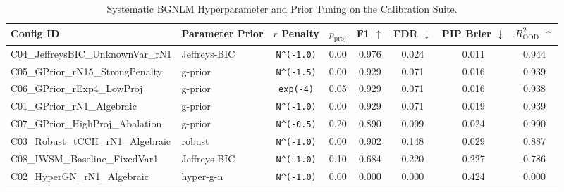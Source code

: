 \begin{table}[t]
\centering
\caption{Systematic BGNLM Hyperparameter and Prior Tuning on the Calibration Suite.}
\label{tab:bgnlm_tuning}
\small
\begin{tabular}{llcccccc}
\toprule
Config ID & Parameter Prior & $r$ Penalty & $p_{\text{proj}}$ & F1 $\uparrow$ & FDR $\downarrow$ & PIP Brier $\downarrow$ & $R^2_{\text{OOD}}$ $\uparrow$ \\
\midrule
C04\_JeffreysBIC\_UnknownVar\_rN1 & Jeffreys-BIC & \texttt{N^(-1.0)} & 0.00 & 0.976 & 0.024 & 0.011 & 0.944 \\
C05\_GPrior\_rN15\_StrongPenalty & g-prior & \texttt{N^(-1.5)} & 0.00 & 0.929 & 0.071 & 0.016 & 0.939 \\
C06\_GPrior\_rExp4\_LowProj & g-prior & \texttt{exp(-4)} & 0.05 & 0.929 & 0.071 & 0.016 & 0.938 \\
C01\_GPrior\_rN1\_Algebraic & g-prior & \texttt{N^(-1.0)} & 0.00 & 0.929 & 0.071 & 0.019 & 0.939 \\
C07\_GPrior\_HighProj\_Abalation & g-prior & \texttt{N^(-0.5)} & 0.20 & 0.890 & 0.099 & 0.024 & 0.990 \\
C03\_Robust\_tCCH\_rN1\_Algebraic & robust & \texttt{N^(-1.0)} & 0.00 & 0.902 & 0.148 & 0.029 & 0.887 \\
C08\_IWSM\_Baseline\_FixedVar1 & Jeffreys-BIC & \texttt{N^(-1.0)} & 0.10 & 0.684 & 0.220 & 0.227 & 0.786 \\
C02\_HyperGN\_rN1\_Algebraic & hyper-g-n & \texttt{N^(-1.0)} & 0.00 & 0.000 & 0.000 & 0.424 & 0.000 \\
\bottomrule
\end{tabular}
\end{table}
